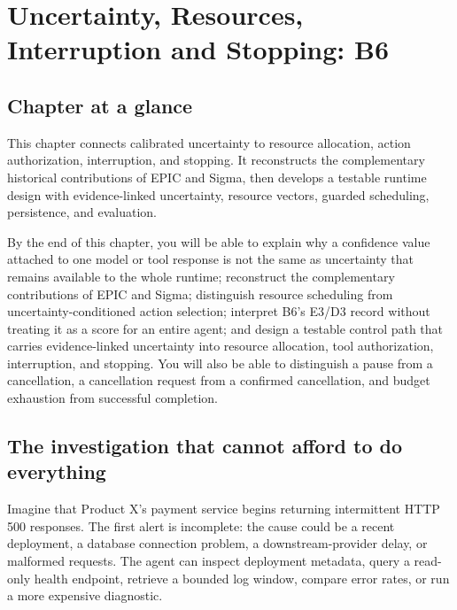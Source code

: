 \chapter{Uncertainty, Resources, Interruption and Stopping: B6}
\label{ch:uncertainty-resources-b6}

\section*{Chapter at a glance}
{}

This chapter connects calibrated uncertainty to resource allocation, action authorization, interruption, and stopping. It reconstructs the complementary historical contributions of EPIC and Sigma, then develops a testable runtime design with evidence-linked uncertainty, resource vectors, guarded scheduling, persistence, and evaluation.

\begin{learningbox}
By the end of this chapter, you will be able to explain why a confidence value attached to one model or tool response is not the same as uncertainty that remains available to the whole runtime; reconstruct the complementary contributions of EPIC and Sigma; distinguish resource scheduling from uncertainty-conditioned action selection; interpret B6's E3/D3 record without treating it as a score for an entire agent; and design a testable control path that carries evidence-linked uncertainty into resource allocation, tool authorization, interruption, and stopping. You will also be able to distinguish a pause from a cancellation, a cancellation request from a confirmed cancellation, and budget exhaustion from successful completion.
\end{learningbox}

\section{The investigation that cannot afford to do everything}
\label{sec:ch16-opening}

Imagine that Product X's payment service begins returning intermittent HTTP 500 responses. The first alert is incomplete: the cause could be a recent deployment, a database connection problem, a downstream-provider delay, or malformed requests. The agent can inspect deployment metadata, query a read-only health endpoint, retrieve a bounded log window, compare error rates, or run a more expensive diagnostic.

